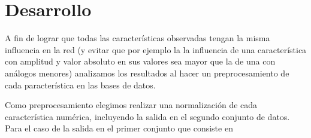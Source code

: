 \documentclass[informe.tex]{subfiles}
\begin{document}
  
  \section{Desarrollo}

  A fin de lograr que todas las características observadas tengan la misma influencia en la red (y evitar que por ejemplo la la influencia de una característica con amplitud y valor absoluto en sus valores sea mayor que la de una con análogos menores) analizamos los resultados al hacer un preprocesamiento de cada paracterística en las bases de datos.
  
  Como preprocesamiento elegimos realizar una normalización de cada característica numérica, incluyendo la salida en el segundo conjunto de datos. Para el caso de la salida en el primer conjunto que consiste en 
  
\end{document}
